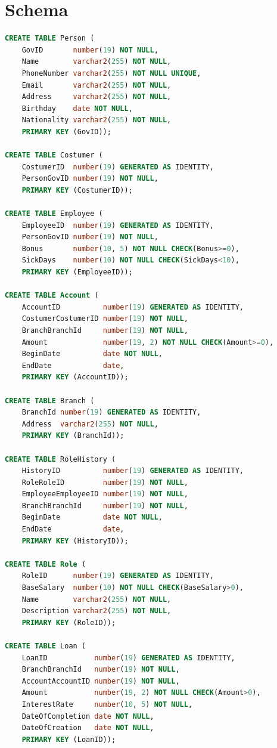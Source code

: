 \documentclass[a4paper, 10pt]{article}
\begin{document}
\section{Schema}
\begin{lstlisting}[language=SQL]
CREATE TABLE Person (
    GovID       number(19) NOT NULL, 
    Name        varchar2(255) NOT NULL, 
    PhoneNumber varchar2(255) NOT NULL UNIQUE, 
    Email       varchar2(255) NOT NULL, 
    Address     varchar2(255) NOT NULL, 
    Birthday    date NOT NULL, 
    Nationality varchar2(255) NOT NULL, 
    PRIMARY KEY (GovID));

CREATE TABLE Costumer (
    CostumerID  number(19) GENERATED AS IDENTITY, 
    PersonGovID number(19) NOT NULL, 
    PRIMARY KEY (CostumerID));

CREATE TABLE Employee (
    EmployeeID  number(19) GENERATED AS IDENTITY, 
    PersonGovID number(19) NOT NULL, 
    Bonus       number(10, 5) NOT NULL CHECK(Bonus>=0), 
    SickDays    number(10) NOT NULL CHECK(SickDays<10), 
    PRIMARY KEY (EmployeeID));

CREATE TABLE Account (
    AccountID          number(19) GENERATED AS IDENTITY, 
    CostumerCostumerID number(19) NOT NULL, 
    BranchBranchId     number(19) NOT NULL, 
    Amount             number(19, 2) NOT NULL CHECK(Amount>=0), 
    BeginDate          date NOT NULL, 
    EndDate            date, 
    PRIMARY KEY (AccountID));

CREATE TABLE Branch (
    BranchId number(19) GENERATED AS IDENTITY, 
    Address  varchar2(255) NOT NULL, 
    PRIMARY KEY (BranchId));

CREATE TABLE RoleHistory (
    HistoryID          number(19) GENERATED AS IDENTITY, 
    RoleRoleID         number(19) NOT NULL, 
    EmployeeEmployeeID number(19) NOT NULL, 
    BranchBranchId     number(19) NOT NULL, 
    BeginDate          date NOT NULL, 
    EndDate            date, 
    PRIMARY KEY (HistoryID));

CREATE TABLE Role (
    RoleID      number(19) GENERATED AS IDENTITY, 
    BaseSalary  number(10) NOT NULL CHECK(BaseSalary>0), 
    Name        varchar2(255) NOT NULL, 
    Description varchar2(255) NOT NULL, 
    PRIMARY KEY (RoleID));

CREATE TABLE Loan (
    LoanID           number(19) GENERATED AS IDENTITY, 
    BranchBranchId   number(19) NOT NULL, 
    AccountAccountID number(19) NOT NULL, 
    Amount           number(19, 2) NOT NULL CHECK(Amount>0), 
    InterestRate     number(10, 5) NOT NULL, 
    DateOfCompletion date NOT NULL, 
    DateOfCreation   date NOT NULL, 
    PRIMARY KEY (LoanID));


\end{lstlisting}
\end{document}
